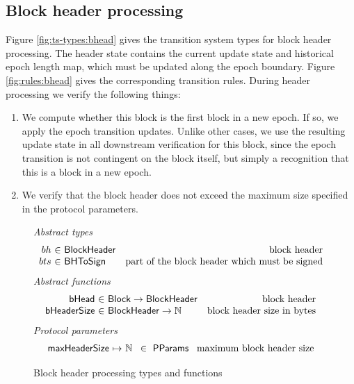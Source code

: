 \documentclass[11pt,a4paper]{article}
\newcommand{\fun}[1]{\mathsf{#1}}
\newcommand{\type}[1]{\mathsf{#1}}
\newcommand{\totalf}{\to}
\newcommand{\partialf}{\mapsto}
\newcommand{\Block}{\type{Block}}
\newcommand{\ProtParams}{\type{PParams}} %
\newcommand{\bhdrsizename}{bHeaderSize}
\begin{document}
\subsection{Block header processing}

Figure \ref{fig:ts-types:bhead} gives the transition system types for block
header processing. The header state contains the current update state and
historical epoch length map, which must be updated along the epoch boundary.
Figure \ref{fig:rules:bhead} gives the corresponding transition rules. During
header processing we verify the following things:

\begin{enumerate}
  \item We compute whether this block is the first block in a new epoch.
    If so, we apply the epoch transition updates. Unlike other cases, we use the
    resulting update state in all downstream verification for this block, since
    the epoch transition is not contingent on the block itself, but simply a
    recognition that this is a block in a new epoch.
  \item We verify that the block header does not exceed the maximum size
    specified in the protocol parameters.
\end{enumerate}

\begin{figure}[ht]
  \emph{Abstract types}
  \begin{equation*}
    \begin{array}{r@{~\in~}lr}
      bh & \Bhead & \text{block header} \\
      bts & \Bhtosign & \text{part of the block header which must be signed}
    \end{array}
  \end{equation*}
  \emph{Abstract functions}
  \begin{equation*}
    \begin{array}{r@{~\in~}lr}
      \fun{\bheadname} & \Block \totalf \Bhead & \text{block header} \\
      \fun{\bhdrsizename} & \Bhead \totalf \mathbb{N} & \text{block header size in bytes}\\
    \end{array}
  \end{equation*}
  \emph{Protocol parameters}
  \begin{equation*}
    \begin{array}{r@{~\partialf~}l!{~\in~\ProtParams~}r}
      \maxheadersize & \mathbb{N} & \text{maximum block header size} \\
    \end{array}
  \end{equation*}
  \caption{Block header processing types and functions}
  \label{fig:defs:bhead}
\end{figure}
\end{document}
